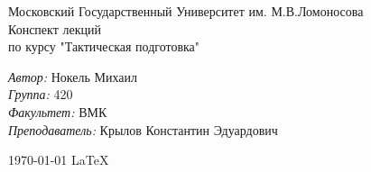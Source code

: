 \documentclass[a4paper,12pt]{article}
\date{\today}
\begin{document}
	\begin{titlepage}
		\begin{center}
			\large Московский Государственный Университет им. М.В.Ломоносова\\[4,5cm]
			\huge Конспект лекций \\[0,6cm]
			\large по курсу "Тактическая подготовка"\\[3,7cm]
				\vspace{2cm}
				\begin{flushright}
						\emph{Автор:} Нокель Михаил\\
						\emph{Группа:} 420\\
						\emph{Факультет:} ВМК\\
						\emph{Преподаватель:} Крылов Константин Эдуардович\\
				\end{flushright}
			\vfill
			{\large \today}
			{\large \LaTeX}			
		\end{center}
	\thispagestyle{empty}
	\end{titlepage}
	\newpage
	\tableofcontents
	\thispagestyle{empty}
	\newpage
\end{document}
